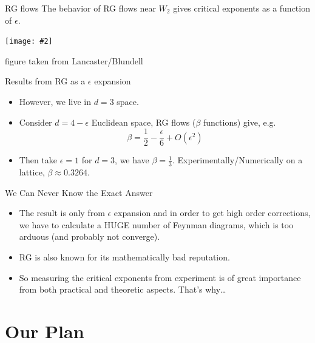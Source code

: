 \documentclass[aspectratio=1610,14pt]{beamer}
\newcommand{\cpic}[2]{
\begin{center}
\texttt{[image: \#2]}
\end{center}
}
\begin{document}
\begin{frame}{RG flows}
The behavior of RG flows near $W_2$ gives critical exponents as a function of $\epsilon$.
\cpic{0.8}{rg}
{\tiny *figure taken from Lancaster/Blundell}
\end{frame}

\begin{frame}{Results from RG as a $\epsilon$ expansion}
\begin{itemize}
\item
However, we live in $d=3$ space.
\item
Consider $d=4-\epsilon$ Euclidean space, RG flows ($\beta$ functions) give, e.g.
$$
\beta = \frac{1}{2} - \frac{\epsilon}{6} + O(\epsilon^2)
$$
\item Then take $\epsilon =1 $ for $d=3$, we have $\beta = \frac{1}{3}$. Experimentally/Numerically on a lattice, $ \beta \approx 0.3264$.
\end{itemize}
\end{frame}


\begin{frame}{We Can Never Know the Exact Answer}
\begin{itemize}
\item
The result is only from $\epsilon$ expansion and in order to get high order corrections, we have to calculate a HUGE number of Feynman diagrams, which is too arduous (and probably not converge).
\item
RG is also known for its mathematically bad reputation.
\item
So measuring the critical exponents from experiment is of great importance from both practical and theoretic aspects. That's why\dots
\end{itemize}
\end{frame}

\section{Our Plan}
\end{document}

